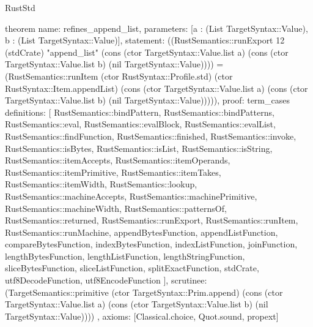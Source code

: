 \begin{lexlean}{RustStd}
\begin{semanticmodule}
theorem{
  name: refines_append_list,
  parameters: [a : (List TargetSyntax::Value), b : (List TargetSyntax::Value)],
  statement: ((RustSemantics::runExport 12 (stdCrate) "append_list" (cons (ctor TargetSyntax::Value.list a) (cons (ctor TargetSyntax::Value.list b) (nil TargetSyntax::Value)))) = (RustSemantics::runItem (ctor RustSyntax::Profile.std) (ctor RustSyntax::Item.appendList) (cons (ctor TargetSyntax::Value.list a) (cons (ctor TargetSyntax::Value.list b) (nil TargetSyntax::Value))))),
  proof: term_cases{
    definitions: [
      RustSemantics::bindPattern,
      RustSemantics::bindPatterns,
      RustSemantics::eval,
      RustSemantics::evalBlock,
      RustSemantics::evalList,
      RustSemantics::findFunction,
      RustSemantics::finished,
      RustSemantics::invoke,
      RustSemantics::isBytes,
      RustSemantics::isList,
      RustSemantics::isString,
      RustSemantics::itemAccepts,
      RustSemantics::itemOperands,
      RustSemantics::itemPrimitive,
      RustSemantics::itemTakes,
      RustSemantics::itemWidth,
      RustSemantics::lookup,
      RustSemantics::machineAccepts,
      RustSemantics::machinePrimitive,
      RustSemantics::machineWidth,
      RustSemantics::patternsOf,
      RustSemantics::returned,
      RustSemantics::runExport,
      RustSemantics::runItem,
      RustSemantics::runMachine,
      appendBytesFunction,
      appendListFunction,
      compareBytesFunction,
      indexBytesFunction,
      indexListFunction,
      joinFunction,
      lengthBytesFunction,
      lengthListFunction,
      lengthStringFunction,
      sliceBytesFunction,
      sliceListFunction,
      splitExactFunction,
      stdCrate,
      utf8DecodeFunction,
      utf8EncodeFunction
    ],
    scrutinee: (TargetSemantics::primitive (ctor TargetSyntax::Prim.append) (cons (ctor TargetSyntax::Value.list a) (cons (ctor TargetSyntax::Value.list b) (nil TargetSyntax::Value))))
  },
  axioms: [Classical.choice, Quot.sound, propext]
}


\end{semanticmodule}
\end{lexlean}
